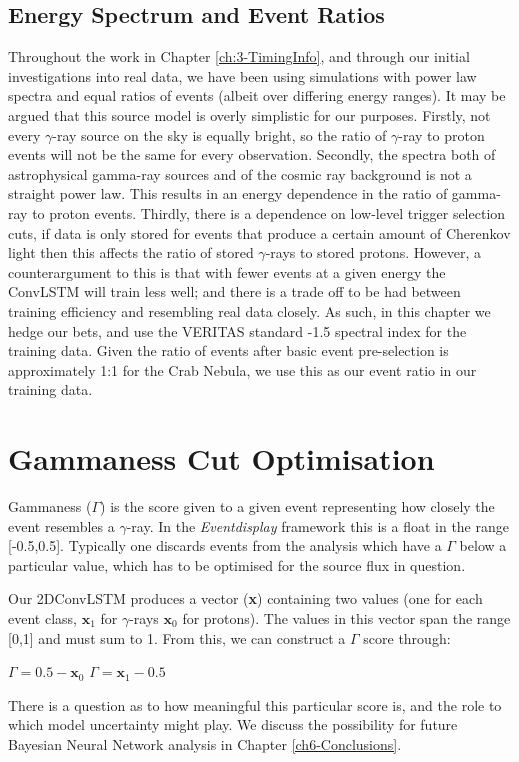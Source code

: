 \subsection{Energy Spectrum and Event Ratios}
Throughout the work in Chapter \ref{ch:3-TimingInfo}, and through our initial investigations into real data, we have been using simulations with power law spectra and equal ratios of events (albeit over differing energy ranges). It may be argued that this source model is overly simplistic for our purposes. Firstly, not every $\gamma$-ray source on the sky is equally bright, so the ratio of $\gamma$-ray to proton events will not be the same for every observation. Secondly, the spectra both of astrophysical gamma-ray sources and of the cosmic ray background is not a straight power law. This results in an energy dependence in the ratio of gamma-ray to proton events. Thirdly, there is a dependence on low-level trigger selection cuts, if data is only stored for events that produce a certain amount of Cherenkov light then this affects the ratio of stored $\gamma$-rays to stored protons. However, a counterargument to this is that with fewer events at a given energy the ConvLSTM will train less well; and there is a trade off to be had between training efficiency and resembling real data closely. As such, in this chapter we hedge our bets, and use the VERITAS standard -1.5 spectral index for the training data. Given the ratio of events after basic event pre-selection is approximately 1:1 for the Crab Nebula, we use this as our event ratio in our training data.

\section{Gammaness Cut Optimisation}
Gammaness ($\Gamma$) is the score given to a given event representing how closely the event resembles a $\gamma$-ray. In the \textit{Eventdisplay} framework this is a float in the range [-0.5,0.5]. Typically one discards events from the analysis which have a $\Gamma$ below a particular value, which has to be optimised for the source flux in question. 

Our 2DConvLSTM produces a vector (\textbf{x}) containing two values (one for each event class,   $\textbf{x}_1$ for $\gamma$-rays $\textbf{x}_0$ for protons). The values in this vector span the range [0,1] and must sum to 1. From this, we can construct a $\Gamma$ score through:

\begin{algorithmic}
    \STATE $\Gamma=0.5-\textbf{x}_0$
    \ELSE
    \STATE $\Gamma=\textbf{x}_1-0.5$
    \ENDIF
\end{algorithmic}
There is a question as to how meaningful this particular score is, and the role to which model uncertainty might play. We discuss the possibility for future Bayesian Neural Network analysis in Chapter \ref{ch6-Conclusions}.


